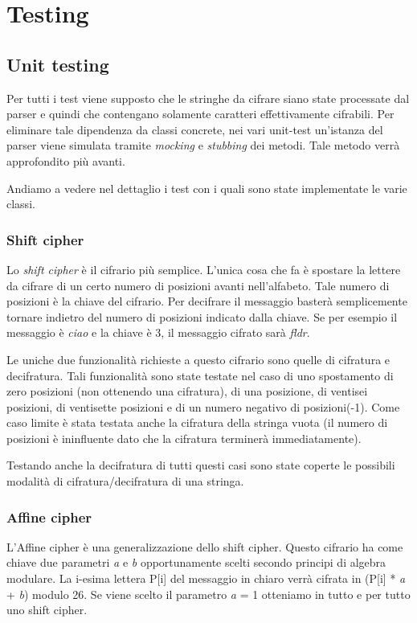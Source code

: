 \chapter{Testing}

	\section{Unit testing}
		Per tutti i test viene supposto che le stringhe da cifrare siano state processate dal parser e quindi che contengano solamente caratteri effettivamente cifrabili. Per eliminare tale dipendenza da classi concrete, nei vari unit-test un'istanza del parser viene simulata tramite \emph{mocking} e \emph{stubbing} dei metodi. Tale metodo verrà approfondito più avanti.
		
		Andiamo a vedere nel dettaglio i test con i quali sono state implementate le varie classi.
		
		\subsection{Shift cipher}
			Lo \emph{shift cipher} è il cifrario più semplice. L'unica cosa che fa è spostare la lettere da cifrare di un certo numero di posizioni avanti nell'alfabeto. Tale numero di posizioni è la chiave del cifrario. Per decifrare il messaggio basterà semplicemente tornare indietro del numero di posizioni indicato dalla chiave. Se per esempio il messaggio è \emph{ciao} e la chiave è 3, il messaggio cifrato sarà \emph{fldr}.
			
			Le uniche due funzionalità richieste a questo cifrario sono quelle di cifratura e decifratura. Tali funzionalità sono state testate nel caso di uno spostamento di zero posizioni (non ottenendo una cifratura), di una posizione, di ventisei posizioni, di ventisette posizioni e di un numero negativo di posizioni(-1). Come caso limite è stata testata anche la cifratura della stringa vuota (il numero di posizioni è ininfluente dato che la cifratura terminerà immediatamente).
			
			Testando anche la decifratura di tutti questi casi sono state coperte le possibili modalità di cifratura/decifratura di una stringa.
			
		\subsection{Affine cipher}
			L'Affine cipher è una generalizzazione dello shift cipher. Questo cifrario ha come chiave due parametri \emph{a} e \emph{b} opportunamente scelti secondo principi di algebra modulare. La i-esima lettera P[i] del messaggio in chiaro verrà cifrata in (P[i] * \emph{a} + \emph{b}) modulo 26. Se viene scelto il parametro \emph{a} = 1 otteniamo in tutto e per tutto uno shift cipher.
			
